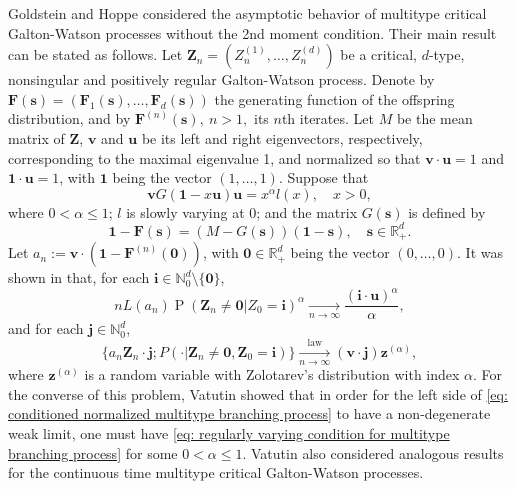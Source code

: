\documentclass[12pt, a4paper]{amsart}
\theoremstyle{definition}
\numberwithin{equation}{section}
\begin{document}
	Goldstein and Hoppe \cite{GoldsteinHoppe1978Critical} considered the asymptotic behavior of multitype critical Galton-Watson processes without the 2nd moment 
    condition. Their main result can be stated as follows. 
	Let $\mathbf Z_n=(Z_n^{(1)}, \dots, Z_n^{(d)})$ be a critical, $d$-type, nonsingular and positively regular Galton-Watson process.
	Denote by $\mathbf F(\mathbf s) = (\mathbf F_1(\mathbf s), \dots, \mathbf F_d(\mathbf s))$ the generating function of the offspring distribution, and by $\mathbf F^{(n)}(\mathbf s), ~ n>1,$ its $n$th iterates.
	Let $M$ be the mean matrix of $\mathbf Z$, $\mathbf v$ and $\mathbf u$ be its left and right  eigenvectors, respectively, corresponding to the maximal eigenvalue 1, and normalized so that $\mathbf v \cdot \mathbf u = 1$ and $\mathbf 1 \cdot \mathbf u = 1$, with $\mathbf 1$ being the vector $(1,\dots, 1)$.
	Suppose that
\begin{equation}\label{eq: regularly varying condition for multitype branching process}
	\mathbf v G(\mathbf 1-x\mathbf u) \mathbf u
	= x^\alpha l(x),
	\quad x > 0,
\end{equation}
	where $0 < \alpha \leq 1$; $l$ is slowly varying at $0$; 
	and the matrix $G(\mathbf s)$ is defined by
\begin{equation}
	\mathbf 1 - \mathbf F(\mathbf s)
	= (M - G(\mathbf s))(\mathbf 1 - \mathbf s),
	\quad \mathbf s \in \mathbb R_+^d.
\end{equation}
    Let $a_n := \mathbf v \cdot (\mathbf 1 - \mathbf F^{(n)}(\mathbf 0))$, with $\mathbf 0 \in \mathbb R_+^d$ being the vector $(0,\dots, 0)$.
	It was shown in \cite{GoldsteinHoppe1978Critical} that, for each $\mathbf i \in \mathbb N_0^d \setminus \{\mathbf 0\}$,
\begin{equation} \label{eq: limit behavior of the exitinction probability without finite variance of multitype branching processes}
	n L(a_n) \operatorname{P}(\mathbf Z_n \neq \mathbf 0| Z_0 = \mathbf i)^\alpha
	\xrightarrow[n\to \infty]{} 
	\frac{(\mathbf i \cdot \mathbf u)^\alpha}\alpha,
\end{equation}
	and for each $\mathbf j \in \mathbb N_0^d$,
\begin{equation}\label{eq: conditioned normalized multitype branching process}
	\{ a_n \mathbf Z_n \cdot \mathbf j ; P(\cdot | \mathbf Z_n \neq \mathbf 0, \mathbf Z_0 = \mathbf i)\}
	\xrightarrow[n\to \infty]{\operatorname{law}} (\mathbf v\cdot \mathbf j) \mathbf z^{(\alpha)},
\end{equation}
	where $\mathbf z^{(\alpha)}$ is a random variable with  Zolotarev's distribution with index  $\alpha$.
	For the converse of this problem, Vatutin \cite{Vatutin1977Limit} showed that in order for the left side of \eqref{eq: conditioned normalized multitype branching process} to have a non-degenerate weak limit, one must have \eqref{eq: regularly varying condition for multitype branching process} for some $0 < \alpha \leq 1$.
	Vatutin \cite{Vatutin1977Limit} also considered analogous results for the continuous time multitype critical Galton-Watson processes.
	
\end{document}
